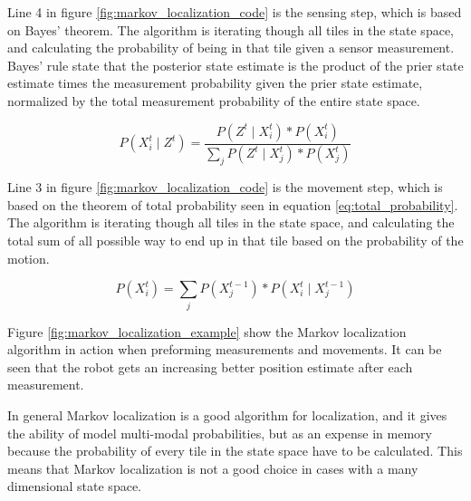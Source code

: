 
Line 4 in figure \ref{fig:markov_localization_code} is the sensing step, which is based on Bayes' theorem.
The algorithm is iterating though all tiles in the state space, and calculating the probability of being in that tile given a sensor measurement.
Bayes' rule state that the posterior state estimate is the product of the prier state estimate times the measurement probability given the prier state estimate, normalized by the total measurement probability of the entire state space.

\begin{equation}
\label{eq:Bayes_theorem}
P(X_{i}^{t} \mid Z^{t}) = \frac{P(Z^{t} \mid X_{i}^{t}) * P(X_{i}^{t})}{\sum_{j} P(Z^{t} \mid X_{j}^{t}) * P(X_{j}^{t})}
\end{equation}

Line 3 in figure \ref{fig:markov_localization_code} is the movement step, which is based on the theorem of total probability seen in equation \ref{eq:total_probability}.
The algorithm is iterating though all tiles in the state space, and calculating the total sum of all possible way to end up in that tile based on the probability of the motion.

\begin{equation}
\label{eq:total_probability}
P(X_{i}^{t}) = \sum_{j} P(X_{j}^{t-1}) * P(X_{i}^{t} \mid X_{j}^{t-1})
\end{equation}

\pagebreak

Figure \ref{fig:markov_localization_example} show the Markov localization algorithm in action when preforming measurements and movements.
It can be seen that the robot gets an increasing better position estimate after each measurement.


In general Markov localization is a good algorithm for localization, and it gives the ability of model multi-modal probabilities, but as an expense in memory because the probability of every tile in the state space have to be calculated.
This means that Markov localization is not a good choice in cases with a many dimensional state space.